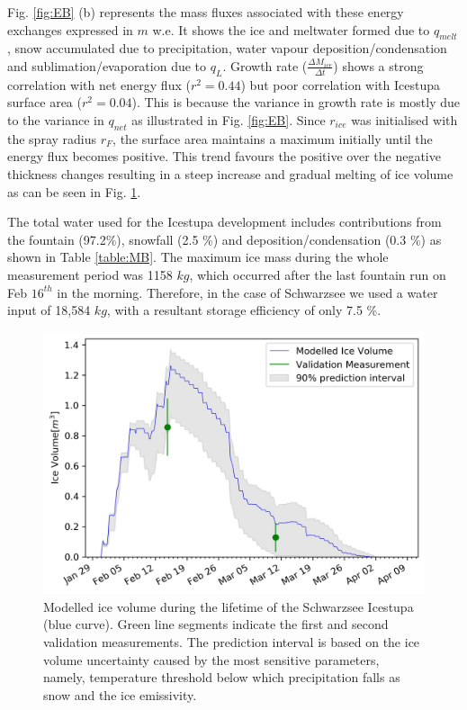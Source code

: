 \documentclass[utf8]{frontiersSCNS} %
\begin{document}
Fig. \ref{fig:EB} (b) represents the mass fluxes associated with these energy exchanges expressed in $m$ w.e. It shows
the ice and meltwater formed due to $q_{melt}$, snow accumulated due to precipitation, water vapour
deposition/condensation and sublimation/evaporation due to $q_L$. Growth rate ($\frac{\Delta M_{ice}}{\Delta t}$)
shows a strong correlation with net energy flux ($r^2 = 0.44$) but poor correlation with Icestupa surface area ($r^2 =
0.04$).  This is because the variance in growth rate is mostly due to the variance in $q_{net}$ as illustrated in Fig.
\ref{fig:EB}. Since $r_{ice}$ was initialised with the spray radius $r_F$, the surface area maintains a maximum
initially until the energy flux becomes positive. This trend favours the positive over the negative thickness changes
resulting in a steep increase and gradual melting of ice volume as can be seen in Fig. \ref{fig:results}.

The total water used for the Icestupa development includes contributions from the fountain (97.2\%), snowfall (2.5 \%)
and deposition/condensation (0.3 \%) as shown in Table \ref{table:MB}. The maximum ice mass during the whole
measurement period was 1158 $kg$, which occurred after the last fountain run on Feb $16^{th}$ in the morning.
Therefore, in the case of Schwarzsee we used a water input of 18,584 $kg$, with a resultant storage efficiency of only
7.5 \%.

  \begin{figure} \begin{center} \includegraphics[width=15 cm]{Figures/Figure_8.jpg} \end{center} \caption{Modelled ice
  volume during the lifetime of the Schwarzsee Icestupa (blue curve). Green line segments indicate the first and
second validation measurements. The prediction interval is based on the ice volume uncertainty caused by the most
sensitive parameters, namely, temperature threshold below which precipitation falls as snow and the ice emissivity.}
\label{fig:results} \end{figure}
  
\end{document}
